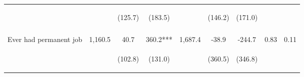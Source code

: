 \begin{tabular}{lcccccccc}
 & \begin{footnotesize}\end{footnotesize} & \begin{footnotesize}(125.7)\end{footnotesize} & \begin{footnotesize}(183.5)\end{footnotesize} & \begin{footnotesize}\end{footnotesize} & \begin{footnotesize}(146.2)\end{footnotesize} & \begin{footnotesize}(171.0)\end{footnotesize} & \begin{footnotesize}\end{footnotesize} & \begin{footnotesize}\end{footnotesize}\\
 & \begin{footnotesize}\end{footnotesize} & \begin{footnotesize}[1.000]\end{footnotesize} & \begin{footnotesize}[0.037]\end{footnotesize} & \begin{footnotesize}\end{footnotesize} & \begin{footnotesize}[1.000]\end{footnotesize} & \begin{footnotesize}[0.443]\end{footnotesize} & \begin{footnotesize}\end{footnotesize} & \begin{footnotesize}\end{footnotesize}\\
\noalign{\smallskip}Ever had permanent job & 1,160.5 & 40.7 & 360.2*** & 1,687.4 & -38.9 & -244.7 & 0.83 & 0.11\\
 & \begin{footnotesize}\end{footnotesize} & \begin{footnotesize}(102.8)\end{footnotesize} & \begin{footnotesize}(131.0)\end{footnotesize} & \begin{footnotesize}\end{footnotesize} & \begin{footnotesize}(360.5)\end{footnotesize} & \begin{footnotesize}(346.8)\end{footnotesize} & \begin{footnotesize}\end{footnotesize} & \begin{footnotesize}\end{footnotesize}\\

\end{tabular}
